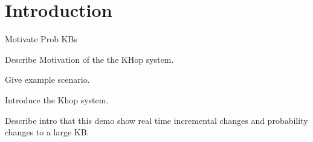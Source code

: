 

\section{Introduction}

Motivate Prob KBs

Describe Motivation of the the KHop system.

Give example scenario.

Introduce the Khop system.

Describe intro that this demo show real time incremental changes and probability changes to a large KB.

